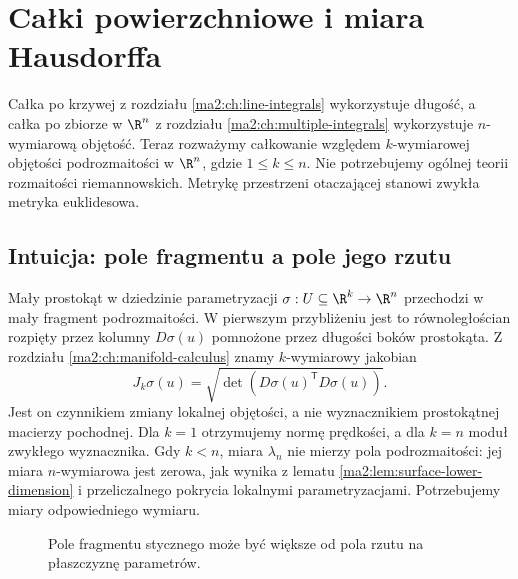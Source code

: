 \chapter{Całki powierzchniowe i miara Hausdorffa}
\label{ma2:ch:surface-integrals}

Całka po krzywej z rozdziału \ref{ma2:ch:line-integrals}
wykorzystuje długość, a całka po zbiorze w $\R^n$
z rozdziału \ref{ma2:ch:multiple-integrals} wykorzystuje
$n$-wymiarową objętość. Teraz rozważymy całkowanie
względem $k$-wymiarowej objętości podrozmaitości
w $\R^n$, gdzie $1\le k\le n$.
Nie potrzebujemy ogólnej teorii rozmaitości
riemannowskich. Metrykę przestrzeni otaczającej
stanowi zwykła metryka euklidesowa.

\section{Intuicja: pole fragmentu a pole jego rzutu}

Mały prostokąt w dziedzinie parametryzacji
$\sigma:U\subseteq\R^k\to\R^n$ przechodzi w mały
fragment podrozmaitości. W pierwszym przybliżeniu
jest to równoległościan rozpięty przez kolumny
$D\sigma(u)$ pomnożone przez długości boków
prostokąta. Z rozdziału \ref{ma2:ch:manifold-calculus}
znamy $k$-wymiarowy jakobian
\[
 J_k\sigma(u)=\sqrt{\det(D\sigma(u)^{\mathsf T}D\sigma(u))}.
\]
Jest on czynnikiem zmiany lokalnej objętości,
a nie wyznacznikiem prostokątnej macierzy pochodnej.
Dla $k=1$ otrzymujemy normę prędkości, a dla $k=n$
moduł zwykłego wyznacznika. Gdy $k<n$, miara
$\lambda_n$ nie mierzy pola podrozmaitości:
jej miara $n$-wymiarowa jest zerowa, jak wynika
z lematu \ref{ma2:lem:surface-lower-dimension}
i przeliczalnego pokrycia lokalnymi parametryzacjami.
Potrzebujemy miary odpowiedniego wymiaru.

\begin{figure}[htbp]
\centering
{}
\caption{Pole fragmentu stycznego może być większe
od pola rzutu na płaszczyznę parametrów.}
\label{ma2:fig:surface-projection}
\end{figure}

